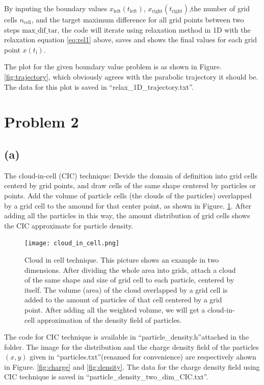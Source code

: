 \documentclass[12pt, graphicx]{article}
\begin{document}
By inputing the boundary values $x_\mathrm{left}(t_\mathrm{left})$, $x_\mathrm{right}(t_\mathrm{right})$,the number of grid cells $n_\mathrm{cell}$, and the target maximum difference for all grid points between two steps $\mathrm{max\_dif\_tar}$, the code will iterate using relaxation method in 1D with the relaxation equation \ref{eq:rel1} above, saves and shows the final values for each grid point $x(t_\mathrm{i})$.\par
The plot for the given boundary value problem is as shown in Figure.\ref{fig:trajectory}, which obviously agrees with the parabolic trajectory it should be. The data for this plot is saved in \textquotedblleft relax\_1D\_trajectory.txt\textquotedblright.

\section*{Problem 2}
\subsection*{(a)}
The cloud-in-cell (CIC) technique: Devide the domain of definition into grid cells centerd by grid points, and draw cells of the same shape centered by particles or points. Add the volume of particle cells (the clouds of the particles) overlapped by a grid cell to the amound for that center point, as shown in Figure. \ref{fig:CIC}. After adding all the particles in this way, the amount distribution of grid cells shows the CIC approximate for particle density.\par

\begin{figure}[ht]
\centering
\texttt{[image: cloud\_in\_cell.png]}
\caption{Cloud in cell technique. This picture shows an example in two dimensions. After dividing the whole area into grids, attach a cloud of the same shape and size of grid cell to each particle, centered by itself. The volume (area) of the cloud overlapped by a grid cell is added to the amount of particles of that cell centered by a grid point. After adding all the weighted volume, we will get a cloud-in-cell approximation of the density field of particles.}
\label{fig:CIC}
\end{figure}

The code for CIC technique is available in \textquotedblleft particle\_density.h\textquotedblright attached in the folder. The image for the distribution and the charge density field of the particles $(x,y)$ given in \textquotedblleft particles.txt\textquotedblright (renamed for convenience) are respectively ahown in Figure. \ref{fig:charge} and \ref{fig:density}. The data for the charge density field using CIC technique is saved in \textquotedblleft particle\_density\_two\_dim\_CIC.txt\textquotedblright.
\end{document}
